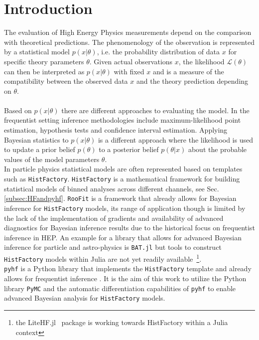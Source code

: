 \section{Introduction}\label{sec:introduction}

The evaluation of High Energy Physics measurements depend on the comparison with theoretical predictions. The phenomenology of the observation is represented by a statistical model $p(x | \theta)$, i.e. the probability distribution of data $x$ for specific theory parameters $\theta$.
Given actual observations $x$, the likelihood $\mathcal{L}(\theta)$ can then be interpreted as $p(x | \theta)$ with fixed $x$ and is a measure of the compatibility between the observed data $x$ and the theory prediction depending on $\theta$.   \\ \\
Based on $p(x | \theta)$ there are different approaches to evaluating the model. In the frequentist setting inference methodologies include maximum-likelihood point estimation, hypothesis tests and confidence interval estimation. Applying Bayesian statistics to $p(x | \theta)$ is a different approach where the likelihood is used to update a prior belief $p(\theta)$ to a posterior belief $p(\theta|x)$ about the probable values of the model parameters $\theta$. \\
In particle physics statistical models are often represented based on templates such as \texttt{HistFactory}. \texttt{HistFactory} is a mathematical framework for building statistical models of binned analyses across different channels, see Sec. \ref{subsec:HFandpyhf}. \texttt{RooFit} \cite{root} is a framework that already allows for Bayesian inference for \texttt{HistFactory} models, its range of application though is limited by the lack of the implementation of gradients and availability of advanced diagnostics for Bayesian inference results due to the historical focus on frequentist inference in HEP. An example for a library that allows for advanced Bayesian inference for particle and astro-physics is \texttt{BAT.jl} \cite{Schulz:2021BAT} but tools to construct \texttt{HistFactory} models within Julia are not yet readily available~\footnote{the LiteHF.jl~\cite{LiteHF} package is working towards HistFactory within a Julia context }. \\
\texttt{pyhf} is a Python library that implements the \texttt{HistFactory} template and already allows for frequentist inference \cite{pyhf, pyhf_joss}. It is the aim of this work to utilize the Python library \texttt{PyMC} and the automatic differentiation capabilities of \texttt{pyhf} to enable advanced Bayesian analysis for \texttt{HistFactory} models.


